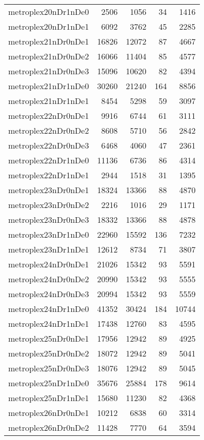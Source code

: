 \begin{tabular}{lrrrr}
metroplex20nDr1nDe0 & 2506 & 1056 & 34 & 1416 \\
metroplex20nDr1nDe1 & 6092 & 3762 & 45 & 2285 \\
metroplex21nDr0nDe1 & 16826 & 12072 & 87 & 4667 \\
metroplex21nDr0nDe2 & 16066 & 11404 & 85 & 4577 \\
metroplex21nDr0nDe3 & 15096 & 10620 & 82 & 4394 \\
metroplex21nDr1nDe0 & 30260 & 21240 & 164 & 8856 \\
metroplex21nDr1nDe1 & 8454 & 5298 & 59 & 3097 \\
metroplex22nDr0nDe1 & 9916 & 6744 & 61 & 3111 \\
metroplex22nDr0nDe2 & 8608 & 5710 & 56 & 2842 \\
metroplex22nDr0nDe3 & 6468 & 4060 & 47 & 2361 \\
metroplex22nDr1nDe0 & 11136 & 6736 & 86 & 4314 \\
metroplex22nDr1nDe1 & 2944 & 1518 & 31 & 1395 \\
metroplex23nDr0nDe1 & 18324 & 13366 & 88 & 4870 \\
metroplex23nDr0nDe2 & 2216 & 1016 & 29 & 1171 \\
metroplex23nDr0nDe3 & 18332 & 13366 & 88 & 4878 \\
metroplex23nDr1nDe0 & 22960 & 15592 & 136 & 7232 \\
metroplex23nDr1nDe1 & 12612 & 8734 & 71 & 3807 \\
metroplex24nDr0nDe1 & 21026 & 15342 & 93 & 5591 \\
metroplex24nDr0nDe2 & 20990 & 15342 & 93 & 5555 \\
metroplex24nDr0nDe3 & 20994 & 15342 & 93 & 5559 \\
metroplex24nDr1nDe0 & 41352 & 30424 & 184 & 10744 \\
metroplex24nDr1nDe1 & 17438 & 12760 & 83 & 4595 \\
metroplex25nDr0nDe1 & 17956 & 12942 & 89 & 4925 \\
metroplex25nDr0nDe2 & 18072 & 12942 & 89 & 5041 \\
metroplex25nDr0nDe3 & 18076 & 12942 & 89 & 5045 \\
metroplex25nDr1nDe0 & 35676 & 25884 & 178 & 9614 \\
metroplex25nDr1nDe1 & 15680 & 11230 & 82 & 4368 \\
metroplex26nDr0nDe1 & 10212 & 6838 & 60 & 3314 \\
metroplex26nDr0nDe2 & 11428 & 7770 & 64 & 3594 \\

\end{tabular}

